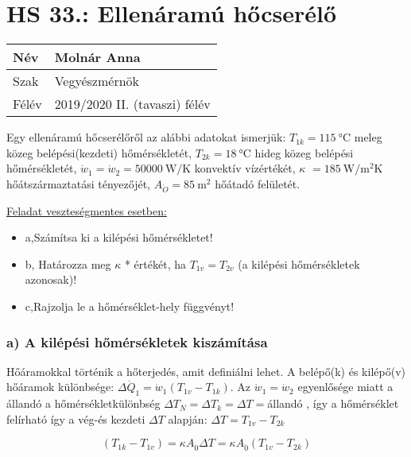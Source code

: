 		
\section*{HS 33.: Ellenáramú hőcserélő}	

\begin{tabular}{ | p{2cm} | p{14cm} | } 
	\hline
	Név & Molnár Anna \\ 
	\hline
	Szak & Vegyészmérnök \\ 
	\hline
	Félév & 2019/2020 II. (tavaszi) félév \\ 
	\hline
\end{tabular}
\vspace{0.5cm}

\noindent
 Egy ellenáramú hőcserélőről az alábbi adatokat ismerjük:
$T_{1k} = \SI{115}{\celsius}$ meleg közeg belépési(kezdeti) hőmérsékletét,
$T_{2k} = \SI{18}{\celsius}$ hideg közeg belépési hőmérsékletét,
$\dot{w}_1 = \dot{w}_2 =\SI{50000}{\watt\per\kelvin}$ konvektív vízértékét,
$\kappa$ $= \SI{185}{\watt\per\meter\squared\kelvin}$ hőátszármaztatási tényezőjét,
$A_{\ddot{O}} = \SI{85}{\meter\squared}$ hőátadó felületét.
\vspace{5mm}

\underline{Feladat veszteségmentes esetben:}
\begin{itemize}
\item a,Számítsa ki a kilépési hőmérsékletet! 
\item b, Határozza meg $\kappa$ * értékét, ha $T_{1v} = T_{2v}$ (a kilépési hőmérsékletek azonosak)!
\item c,Rajzolja le a hőmérséklet-hely függvényt!
\end{itemize}
\vspace{5mm}
\subsubsection*{a) A kilépési hőmérsékletek kiszámítása}

 Hőáramokkal történik a hőterjedés, amit definiálni lehet. A belépő(k) és kilépő(v) hőáramok különbsége: $\Delta \dot{Q}_1 = \dot{w}_1 \left(T_{1v} - T_{1k}\right)$.
 Az $\dot{w}_1 = \dot{w}_2$ egyenlősége miatt a állandó a hőmérsékletkülönbség $\Delta T_N = \Delta T_k = \Delta T = $állandó , így a hőmérséklet felírható így a vég-és kezdeti $\Delta T$ alapján:
 $\Delta T = T_{1v} - T_{2k}$

\begin{equation}
  \left(T_{1k} - T_{1v}\right) = \kappa A_{\ddot{0}} \Delta T = \kappa A_{\ddot{0}} \left(T_{1v} - T_{2k}\right)
 \end{equation}

